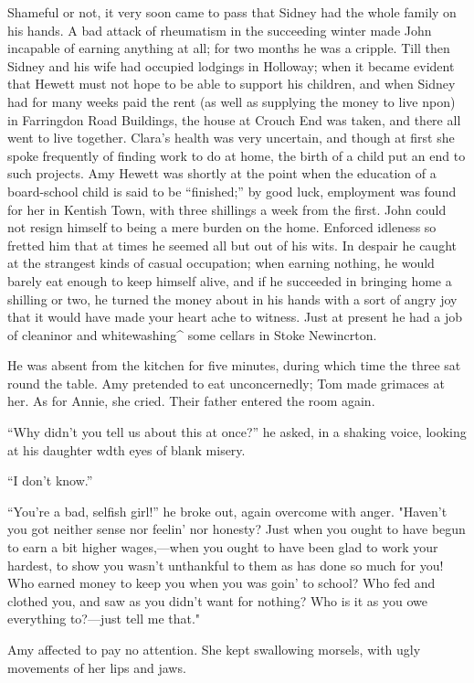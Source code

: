 Shameful or not, it very soon came to pass that Sidney had the whole
family on his hands. {}A bad attack of rheumatism in the succeeding
winter made John incapable of earning anything at all; for two months he
was a cripple. Till then Sidney and his wife had occupied lodgings in
Holloway; when it became evident that Hewett must not hope to be able to
support his children, and when Sidney had for many weeks paid the rent
(as well as supplying the money to live npon) in Farringdon Road
Buildings, the house at Crouch End was taken, and there all went to live
together. Clara's health was very uncertain, and though at first she
spoke frequently of finding work to do at home, the birth of a child put
an end to such projects. Amy Hewett was shortly at the point when the
education of a board-school child is said to be ``finished;'' by good
luck, employment was found for her in Kentish Town, with three shillings
a week from the first. John could not resign himself to being a mere
burden on the home. Enforced idleness so fretted him that at times he
seemed all but out of his wits. In despair he caught at the strangest
kinds of casual occupation; when earning nothing, he would barely eat
enough to keep himself alive, and if he succeeded in bringing {} home a
shilling or two, he turned the money about in his hands with a sort of
angry joy that it would have made your heart ache to witness. Just at
present he had a job of cleaninor and whitewashing\^{} some cellars in
Stoke Newincrton.

He was absent from the kitchen for five minutes, during which time the
three sat round the table. Amy pretended to eat unconcernedly; Tom made
grimaces at her. As for Annie, she cried. Their father entered the room
again.

``Why didn't you tell us about this at once?'' he asked, in a shaking
voice, looking at his daughter wdth eyes of blank misery.

``I don't know.''

``You're a bad, selfish girl!'' he broke out, again overcome with anger.
"Haven't you got neither sense nor feelin' nor honesty? Just when you
ought to have begun to earn a bit higher wages,---when you ought to have
been glad to work your hardest, to show you wasn't unthankful to them as
has done so much for you! Who earned money to keep you when you was
goin' to school? Who fed and clothed you, and saw as you didn't want {}
for nothing? Who is it as you owe everything to?---just tell me that."

Amy affected to pay no attention. She kept swallowing morsels, with ugly
movements of her lips and jaws.

